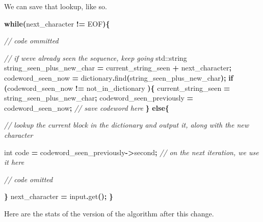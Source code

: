 \documentclass[12pt,twoside]{reedthesis}
\newenvironment{Shaded}{\begin{snugshade}}{\end{snugshade}}
\newcommand{\BuiltInTok}[1]{#1}
\newcommand{\CommentTok}[1]{\textcolor[rgb]{0.56,0.35,0.01}{\textit{#1}}}
\newcommand{\ControlFlowTok}[1]{\textcolor[rgb]{0.13,0.29,0.53}{\textbf{#1}}}
\newcommand{\DataTypeTok}[1]{\textcolor[rgb]{0.13,0.29,0.53}{#1}}
\newcommand{\NormalTok}[1]{#1}
\newcommand{\OperatorTok}[1]{\textcolor[rgb]{0.81,0.36,0.00}{\textbf{#1}}}
\begin{document}
We can save that lookup, like so.
\begin{Shaded}
\begin{Highlighting}[]

    \ControlFlowTok{while}\OperatorTok{(}\NormalTok{next\_character }\OperatorTok{!=}\NormalTok{ EOF}\OperatorTok{)\{}

        \CommentTok{// code ommitted}

        \CommentTok{// if we\textquotesingle{}ve already seen the sequence, keep going}
        \BuiltInTok{std::}\NormalTok{string}\OperatorTok{ }\NormalTok{string\_seen\_plus\_new\_char }\OperatorTok{=}\NormalTok{ current\_string\_seen }\OperatorTok{+}\NormalTok{ next\_character}\OperatorTok{;}
\NormalTok{        codeword\_seen\_now }\OperatorTok{=}\NormalTok{ dictionary}\OperatorTok{.}\NormalTok{find}\OperatorTok{(}\NormalTok{string\_seen\_plus\_new\_char}\OperatorTok{);}
        \ControlFlowTok{if} \OperatorTok{(}\NormalTok{codeword\_seen\_now }\OperatorTok{!=}\NormalTok{ not\_in\_dictionary }\OperatorTok{)\{}
\NormalTok{            current\_string\_seen }\OperatorTok{=}\NormalTok{ string\_seen\_plus\_new\_char}\OperatorTok{;}
\NormalTok{            codeword\_seen\_previously }\OperatorTok{=}\NormalTok{ codeword\_seen\_now}\OperatorTok{;} \CommentTok{// save codeword here}
        \OperatorTok{\}}
        \ControlFlowTok{else}\OperatorTok{\{}

            \CommentTok{// lookup the current block in the dictionary and output it, along with the new character}

            \DataTypeTok{int}\NormalTok{ code }\OperatorTok{=}\NormalTok{ codeword\_seen\_previously}\OperatorTok{{-}\textgreater{}}\NormalTok{second}\OperatorTok{;} \CommentTok{// on the next iteration, we use it here}

            \CommentTok{// code omitted}

        \OperatorTok{\}}
\NormalTok{        next\_character }\OperatorTok{=}\NormalTok{ input}\OperatorTok{.}\NormalTok{get}\OperatorTok{();}
    \OperatorTok{\}}
\end{Highlighting}
\end{Shaded}
Here are the stats of the version of the algorithm after this change.
\end{document}
